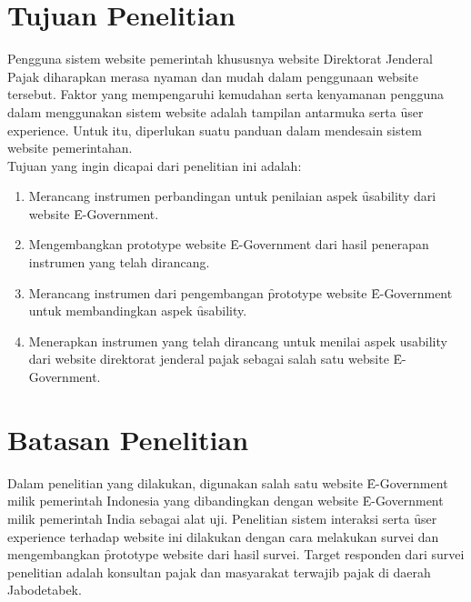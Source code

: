 \section{Tujuan Penelitian}
Pengguna sistem website pemerintah khususnya website Direktorat Jenderal Pajak diharapkan merasa nyaman dan mudah dalam penggunaan website tersebut. Faktor yang mempengaruhi kemudahan serta kenyamanan pengguna dalam menggunakan sistem website adalah tampilan antarmuka serta \f{user experience}. Untuk itu, diperlukan suatu panduan dalam mendesain sistem website pemerintahan.
\newline\\
Tujuan yang ingin dicapai dari penelitian ini adalah:
\begin{enumerate}
\item Merancang instrumen perbandingan untuk penilaian aspek \f{usability} dari website \f{E-Government}.
\item Mengembangkan prototype website \f{E-Government} dari hasil penerapan instrumen yang telah dirancang.
\item Merancang instrumen dari pengembangan \f{prototype} website \f{E-Government} untuk membandingkan aspek \f{usability}.
\item Menerapkan instrumen yang telah dirancang untuk menilai aspek usability dari website direktorat jenderal pajak sebagai salah satu website \f{E-Government}.
\end{enumerate}
\section{Batasan Penelitian}
Dalam penelitian yang dilakukan, digunakan salah satu website \f{E-Government} milik pemerintah Indonesia yang dibandingkan dengan website \f{E-Government} milik pemerintah India sebagai alat uji. Penelitian sistem interaksi serta \f{user experience} terhadap website ini dilakukan dengan cara melakukan survei dan mengembangkan \f{prototype} website dari hasil survei. Target responden dari survei penelitian adalah konsultan pajak dan masyarakat terwajib pajak di daerah Jabodetabek.
